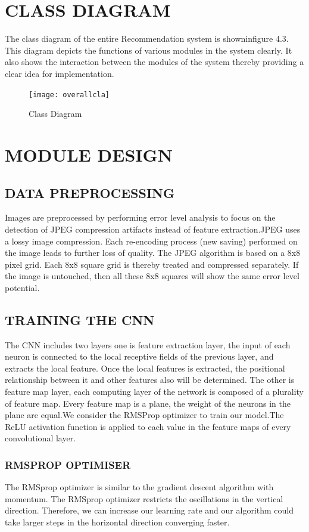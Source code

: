 \section{CLASS DIAGRAM}
The class diagram of the entire Recommendation system is showninﬁgure 4.3. This diagram depicts the functions of various modules in the system clearly. It also shows the interaction between the modules of the system thereby providing a clear idea for implementation.

\begin{figure}[h!]
\centering
\texttt{[image: overallcla]}
\caption{Class Diagram}
\label{fig:universe}
\end{figure}

\section{MODULE DESIGN}
\subsection{DATA PREPROCESSING }
Images are preprocessed by performing error level analysis to focus on the detection of JPEG compression artifacts instead of feature extraction.JPEG uses a lossy image compression. Each re-encoding process (new saving) performed on the image leads to further loss of quality. The JPEG algorithm is based on a 8x8 pixel grid. Each 8x8 square grid is thereby treated and compressed separately. If the image is untouched, then all these 8x8 squares will show the same error level potential.  
 
\subsection{TRAINING THE CNN}
The CNN includes two layers one is feature extraction layer, the input of each neuron is connected to the local receptive fields of the previous layer, and extracts the local feature. Once the local features is extracted, the positional relationship between it and other features also will be determined. The other is feature map layer, each computing layer of the network is composed of a plurality of feature map. Every feature map is a plane, the weight of the neurons in the plane are equal.We consider the RMSProp optimizer  to train our model.The ReLU activation function is applied to each value in the feature maps of every convolutional layer. 
\subsubsection{RMSPROP OPTIMISER}
The RMSprop optimizer is similar to the gradient descent algorithm with momentum. The RMSprop optimizer restricts the oscillations in the vertical direction. Therefore, we can increase our learning rate and our algorithm could take larger steps in the horizontal direction converging faster.
